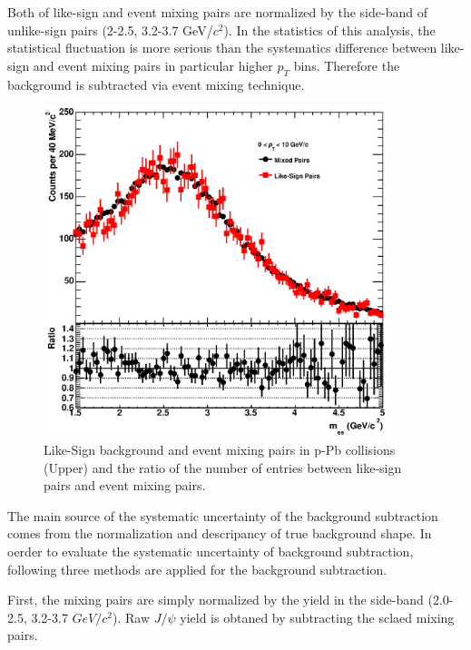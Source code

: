 Both of like-sign and event mixing pairs are normalized by the side-band of unlike-sign pairs (2-2.5, 3.2-3.7 GeV/$c^{2}$).
In the statistics of this analysis, the statistical fluctuation is more serious than the systematics difference between like-sign and event mixing pairs in particular higher $p_T$ bins. 
Therefore the background is subtracted via event mixing technique. 
\begin{figure}[!h]
  \centering
  \includegraphics[width=10cm]{chap4/figure/SignalExtraction/BGComparison_MB.eps}
  \caption{Like-Sign background and event mixing pairs in p-Pb collisions (Upper) and the ratio of the number of entries between like-sign pairs and event mixing pairs. }
  \label{fig_4_bgcomp}
\end{figure}

The main source of the systematic uncertainty of the background subtraction comes from the normalization and descripancy of true background shape. 
In oerder to evaluate the systematic uncertainty of background subtraction, following three methods are applied for the background subtraction. 

First, the mixing pairs are simply normalized by the yield in the side-band (2.0-2.5, 3.2-3.7 $GeV/c^{2}$). 
Raw $J/\psi$ yield is obtaned by subtracting the sclaed mixing pairs. 

